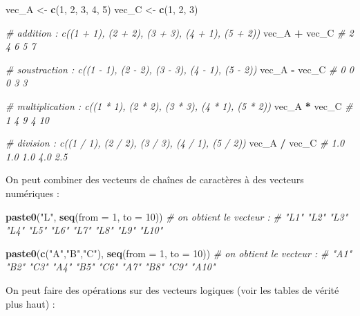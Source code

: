\documentclass[
]{book}
\newenvironment{Shaded}{\begin{snugshade}}{\end{snugshade}}
\newcommand{\AttributeTok}[1]{\textcolor[rgb]{0.13,0.29,0.53}{#1}}
\newcommand{\CommentTok}[1]{\textcolor[rgb]{0.56,0.35,0.01}{\textit{#1}}}
\newcommand{\DecValTok}[1]{\textcolor[rgb]{0.00,0.00,0.81}{#1}}
\newcommand{\FunctionTok}[1]{\textcolor[rgb]{0.13,0.29,0.53}{\textbf{#1}}}
\newcommand{\NormalTok}[1]{#1}
\newcommand{\OtherTok}[1]{\textcolor[rgb]{0.56,0.35,0.01}{#1}}
\newcommand{\SpecialCharTok}[1]{\textcolor[rgb]{0.81,0.36,0.00}{\textbf{#1}}}
\newcommand{\StringTok}[1]{\textcolor[rgb]{0.31,0.60,0.02}{#1}}
\begin{document}
\begin{Shaded}
\begin{Highlighting}[]
\NormalTok{vec\_A }\OtherTok{\textless{}{-}} \FunctionTok{c}\NormalTok{(}\DecValTok{1}\NormalTok{, }\DecValTok{2}\NormalTok{, }\DecValTok{3}\NormalTok{, }\DecValTok{4}\NormalTok{, }\DecValTok{5}\NormalTok{)}
\NormalTok{vec\_C }\OtherTok{\textless{}{-}} \FunctionTok{c}\NormalTok{(}\DecValTok{1}\NormalTok{, }\DecValTok{2}\NormalTok{, }\DecValTok{3}\NormalTok{)}

\CommentTok{\# addition : c((1 + 1), (2 + 2), (3 + 3), (4 + 1), (5 + 2))}
\NormalTok{vec\_A }\SpecialCharTok{+}\NormalTok{ vec\_C }\CommentTok{\# 2 4 6 5 7}

\CommentTok{\# soustraction : c((1 {-} 1), (2 {-} 2), (3 {-} 3), (4 {-} 1), (5 {-} 2))}
\NormalTok{vec\_A }\SpecialCharTok{{-}}\NormalTok{ vec\_C }\CommentTok{\# 0 0 0 3 3}

\CommentTok{\# multiplication : c((1 * 1), (2 * 2), (3 * 3), (4 * 1), (5 * 2))}
\NormalTok{vec\_A }\SpecialCharTok{*}\NormalTok{ vec\_C  }\CommentTok{\# 1  4  9  4 10}

\CommentTok{\# division : c((1 / 1), (2 / 2), (3 / 3), (4 / 1), (5 / 2))}
\NormalTok{vec\_A }\SpecialCharTok{/}\NormalTok{ vec\_C }\CommentTok{\# 1.0 1.0 1.0 4.0 2.5}
\end{Highlighting}
\end{Shaded}

On peut combiner des vecteurs de chaînes de caractères à des vecteurs numériques :

\begin{Shaded}
\begin{Highlighting}[]
\FunctionTok{paste0}\NormalTok{(}\StringTok{"L"}\NormalTok{, }\FunctionTok{seq}\NormalTok{(}\AttributeTok{from =} \DecValTok{1}\NormalTok{, }\AttributeTok{to =} \DecValTok{10}\NormalTok{)) }
\CommentTok{\# on obtient le vecteur :}
\CommentTok{\# "L1"  "L2"  "L3"  "L4"  "L5"  "L6"  "L7"  "L8"  "L9"  "L10"}

\FunctionTok{paste0}\NormalTok{(}\FunctionTok{c}\NormalTok{(}\StringTok{"A"}\NormalTok{,}\StringTok{"B"}\NormalTok{,}\StringTok{"C"}\NormalTok{), }\FunctionTok{seq}\NormalTok{(}\AttributeTok{from =} \DecValTok{1}\NormalTok{, }\AttributeTok{to =} \DecValTok{10}\NormalTok{))}
\CommentTok{\# on obtient le vecteur : }
\CommentTok{\# "A1"  "B2"  "C3"  "A4"  "B5"  "C6"  "A7"  "B8"  "C9"  "A10"}
\end{Highlighting}
\end{Shaded}

On peut faire des opérations sur des vecteurs logiques (voir les tables de vérité plus haut) :
\end{document}
